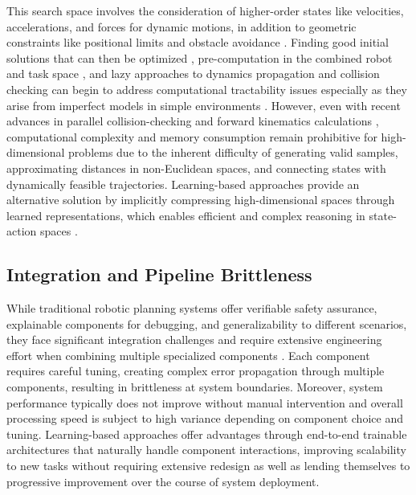 This search space involves the consideration of higher-order states like velocities, accelerations, and forces for dynamic motions, in addition to geometric constraints like positional limits and obstacle avoidance \cite{schmerling2019kinodynamic}. Finding good initial solutions that can then be optimized \cite{kuntz2019fast}, pre-computation in the combined robot and task space \cite{shome2021asymptotically,briscoe2024exploring}, and lazy approaches to dynamics propagation and collision checking \cite{pasricha2024virtues} can begin to address computational tractability issues especially as they arise from imperfect models in simple environments \cite{pasricha2022pokerrt,briscoe2024exploring,abderezaei2024clutter}.
However, even with recent advances in parallel collision-checking and forward kinematics calculations \cite{sundaralingam2023curobo,thomason2024motions}, computational complexity and memory consumption remain prohibitive for high-dimensional problems due to the inherent difficulty of generating valid samples, approximating distances in non-Euclidean spaces, and connecting states with dynamically feasible trajectories.
Learning-based approaches provide an alternative solution by implicitly compressing high-dimensional spaces through learned representations, which enables efficient and complex reasoning in state-action spaces \cite{qureshi2020motion}.

\subsection{Integration and Pipeline Brittleness}
\label{sec:framework:integration}

While traditional robotic planning systems offer verifiable safety assurance, explainable components for debugging, and generalizability to different scenarios, they face significant integration challenges and require extensive engineering effort when combining multiple specialized components \cite{abderezaei2024clutter}. Each component requires careful tuning, creating complex error propagation through multiple components, resulting in brittleness at system boundaries. Moreover, system performance typically does not improve without manual intervention and overall processing speed is subject to high variance depending on component choice and tuning.
Learning-based approaches offer advantages through end-to-end trainable architectures that naturally handle component interactions, improving scalability to new tasks without requiring extensive redesign as well as lending themselves to progressive improvement over the course of system deployment.

